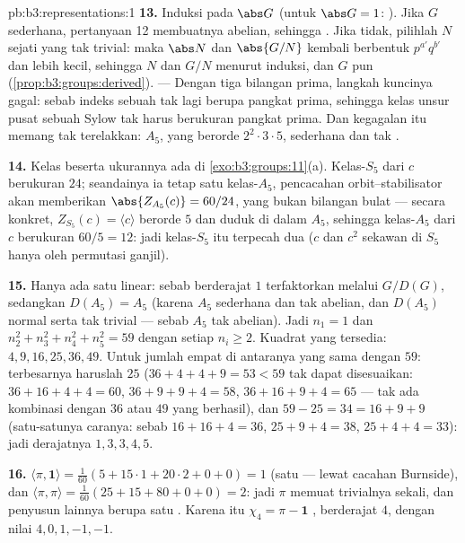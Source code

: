 \begin{solution}{pb:b3:representations:1}
\textbf{13.} Induksi pada $\abs G$ (untuk $\abs G = 1$: ). Jika
$G$ sederhana, pertanyaan 12 membuatnya abelian, sehingga .
Jika tidak, pilihlah $N$  sejati yang tak trivial: maka $\abs
N$ dan $\abs{G/N}$ kembali berbentuk $p^{a'}q^{b'}$ dan
lebih kecil, sehingga $N$ dan $G/N$  menurut induksi, dan $G$ pun
 (\cref{prop:b3:groups:derived}). --- Dengan tiga
bilangan prima, langkah kuncinya gagal: sebab indeks sebuah  tak
lagi berupa pangkat prima, sehingga kelas unsur pusat sebuah
Sylow tak harus berukuran pangkat prima. Dan kegagalan itu memang
tak terelakkan: $A_5$, yang berorde $2^2\cdot3\cdot5$, sederhana dan
tak .

\textbf{14.} Kelas beserta ukurannya ada di
\cref{exo:b3:groups:11}(a). Kelas-$S_5$ dari $c$ berukuran
$24$; seandainya ia tetap satu kelas-$A_5$, pencacahan orbit--stabilisator
akan memberikan $\abs{Z_{A_5}(c)} = 60/24$, yang bukan bilangan bulat ---
secara konkret, $Z_{S_5}(c) = \langle c\rangle$ berorde $5$ dan
duduk di dalam $A_5$, sehingga kelas-$A_5$ dari $c$ berukuran $60/5 =
12$: jadi kelas-$S_5$ itu terpecah dua ($c$ dan $c^2$ sekawan
di $S_5$ hanya oleh permutasi ganjil).

\textbf{15.} Hanya ada satu  linear: sebab  berderajat $1$
terfaktorkan melalui $G/D(G)$, sedangkan $D(A_5) = A_5$ (karena $A_5$ sederhana
dan tak abelian, dan $D(A_5)$ normal serta tak trivial ---
sebab $A_5$ tak abelian). Jadi $n_1 = 1$ dan $n_2^2 + n_3^2 + n_4^2
+ n_5^2 = 59$ dengan setiap $n_i \geq 2$. Kuadrat yang tersedia: $4, 9,
16, 25, 36, 49$. Untuk jumlah empat di antaranya yang sama dengan $59$:
terbesarnya haruslah $25$ ($36 + 4 + 4 + 9 = 53 < 59$ tak dapat
disesuaikan: $36 + 16 + 4 + 4 = 60$, $36 + 9 + 9 + 4 = 58$, $36 +
16 + 9 + 4 = 65$ --- tak ada kombinasi dengan $36$ atau $49$ yang berhasil),
dan $59 - 25 = 34 = 16 + 9 + 9$ (satu-satunya caranya: sebab $16 + 16 + 4 =
36$, $25 + 9 + 4 = 38$, $25 + 4 + 4 = 33$): jadi derajatnya $1, 3, 3,
4, 5$.

\textbf{16.} $\langle\pi, \mathbf 1\rangle = \frac1{60}(5 +
15\cdot1 + 20\cdot2 + 0 + 0) = 1$ (satu  --- lewat cacahan
Burnside), dan $\langle\pi, \pi\rangle = \frac1{60}(25 + 15 + 80 +
0 + 0) = 2$: jadi $\pi$ memuat  trivialnya sekali, dan
penyusun lainnya berupa satu . Karena itu $\chi_4 = \pi
- \mathbf 1$ , berderajat $4$, dengan nilai $4, 0,
1, -1, -1$.


\end{solution}
